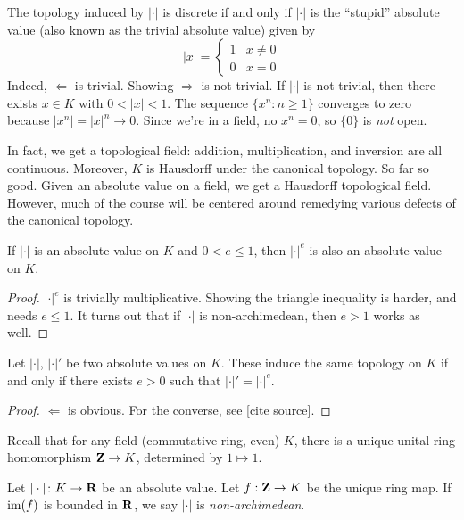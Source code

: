 The topology induced by $|\cdot|$ is discrete if and only if $|\cdot|$ is 
the ``stupid'' absolute value (also known as the trivial absolute value) 
given by 
\[
  |x|=\begin{cases} 1 & x\ne 0 \\ 0 & x=0 \end{cases}
\]
Indeed, $\Leftarrow$ is trivial. Showing $\Rightarrow$ is not trivial. If 
$|\cdot|$ is not trivial, then there exists $x\in K$ with 
$0<|x|<1$. The sequence $\{x^n:n\geqslant 1\}$ converges to zero because 
$|x^n|=|x|^n\to 0$. Since we're in a field, no $x^n=0$, so $\{0\}$ is 
\emph{not} open. 

In fact, we get a topological field: addition, multiplication, and inversion 
are all continuous. Moreover, $K$ is Hausdorff under the canonical topology. 
So far so good. Given an absolute value on a field, we get a Hausdorff topological 
field. However, much of the course will be centered around remedying various 
defects of the canonical topology. 

\begin{lemma}
If $|\cdot|$ is an absolute value on $K$ and $0<e\leqslant 1$, then 
$|\cdot|^e$ is also an absolute value on $K$. 
\end{lemma}
\begin{proof}
$|\cdot|^e$ is trivially multiplicative. Showing the triangle inequality 
is harder, and needs $e\leqslant 1$. It turns out that if $|\cdot|$ is 
non-archimedean, then $e>1$ works as well. 
\end{proof}

\begin{theorem}
Let $|\cdot|$, $|\cdot|'$ be two absolute values on $K$. These induce the 
same topology on $K$ if and only if there exists $e>0$ such that 
$|\cdot|'=|\cdot|^e$. 
\end{theorem}
\begin{proof}
$\Leftarrow$ is obvious. For the converse, see [cite source]. 
\end{proof}

Recall that for any field (commutative ring, even) $K$, there is a unique 
unital ring homomorphism $\mathbf{Z}\to K$, determined by $1\mapsto 1$. 

\begin{definition}
Let $|\cdot|\colon K\to \mathbf{R}$ be an absolute value. Let $f:\mathbf{Z}\to K$ be the 
unique ring map. If $\operatorname{im}(f)$ is bounded in $\mathbf{R}$, we say $|\cdot|$ is 
\emph{non-archimedean}. 
\end{definition}

